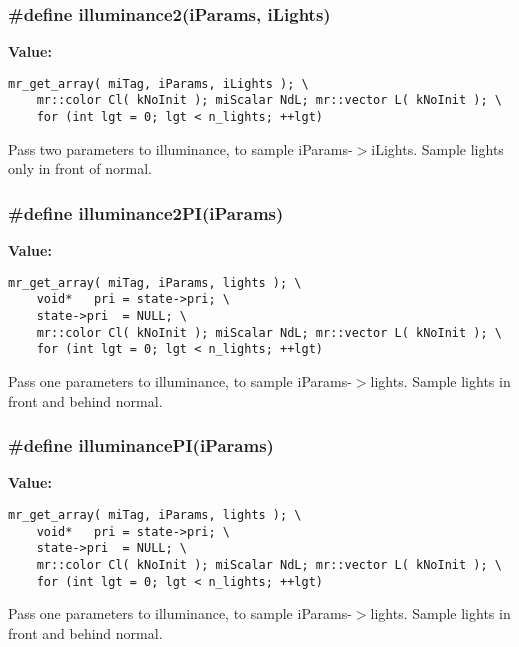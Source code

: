 \subsubsection{\setlength{\rightskip}{0pt plus 5cm}\#define illuminance2(i\-Params, i\-Lights)}\label{mrRman__macros_8h_a18}


{\bf Value:}

\footnotesize\begin{verbatim}mr_get_array( miTag, iParams, iLights ); \
    mr::color Cl( kNoInit ); miScalar NdL; mr::vector L( kNoInit ); \
    for (int lgt = 0; lgt < n_lights; ++lgt)
\end{verbatim}\normalsize 
Pass two parameters to illuminance, to sample i\-Params-$>$i\-Lights. Sample lights only in front of normal. 
\subsubsection{\setlength{\rightskip}{0pt plus 5cm}\#define illuminance2PI(i\-Params)}\label{mrRman__macros_8h_a19}


{\bf Value:}

\footnotesize\begin{verbatim}mr_get_array( miTag, iParams, lights ); \
    void*   pri = state->pri; \
    state->pri  = NULL; \
    mr::color Cl( kNoInit ); miScalar NdL; mr::vector L( kNoInit ); \
    for (int lgt = 0; lgt < n_lights; ++lgt)
\end{verbatim}\normalsize 
Pass one parameters to illuminance, to sample i\-Params-$>$lights. Sample lights in front and behind normal. 
\subsubsection{\setlength{\rightskip}{0pt plus 5cm}\#define illuminance\-PI(i\-Params)}\label{mrRman__macros_8h_a17}


{\bf Value:}

\footnotesize\begin{verbatim}mr_get_array( miTag, iParams, lights ); \
    void*   pri = state->pri; \
    state->pri  = NULL; \
    mr::color Cl( kNoInit ); miScalar NdL; mr::vector L( kNoInit ); \
    for (int lgt = 0; lgt < n_lights; ++lgt)
\end{verbatim}\normalsize 
Pass one parameters to illuminance, to sample i\-Params-$>$lights. Sample lights in front and behind normal. 

